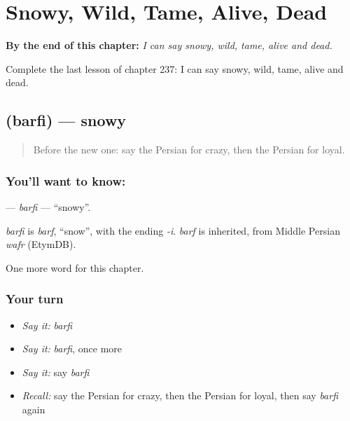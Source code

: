 
\chapter{Snowy, Wild, Tame, Alive, Dead}
\label{ch:fa-snowy-wild-tame-alive-dead}

\begin{chapteropening}
\textbf{By the end of this chapter:} \emph{I can say snowy, wild, tame, alive and dead.}

Complete the last lesson of chapter 237: I can say snowy, wild, tame, alive and dead.
\end{chapteropening}

\section[\texorpdfstring{\fa{برفی} (barfi)}{برفی (barfi)}]{ (barfi) — snowy}

\label{lesson:FA-C237-barfi}



\begin{quote}
Before the new one: say the Persian for crazy, then the Persian for loyal.
\end{quote}

\subsection*{You'll want to know: }
\textbf{} — \emph{barfi} — \textquotedblleft{}snowy\textquotedblright{}.

\begin{cousinweb}
\emph{barfi} is \emph{barf}, \textquotedblleft{}snow\textquotedblright{}, with the ending \emph{-i}. \emph{barf} is inherited, from Middle Persian \emph{wafr} (EtymDB).
\end{cousinweb}

\begin{grammarlens}[title={What you've built}]
One more word for this chapter.
\end{grammarlens}

\subsection*{Your turn}
\begin{itemize}
\raggedright
  \item \emph{Say it:} \emph{barfi}
  \item \emph{Say it:} \emph{barfi}, once more
  \item \emph{Say it:} say \emph{barfi}
  \item \emph{Recall:} say the Persian for crazy, then the Persian for loyal, then say \emph{barfi} again
\end{itemize}

